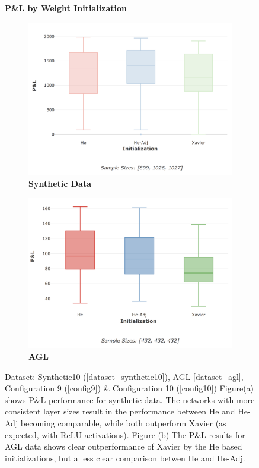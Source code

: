 \documentclass[a4paper,11pt,oneside]{article}
\theoremstyle{plain}
\theoremstyle{definition}
\begin{document}
\begin{figure}[H]
	\centering
	\textbf{P\&L by Weight Initialization}
	\begin{subfigure}{.5\textwidth}
		\centering 
		\includegraphics[scale=0.28]{images/results/newinit/synth_pl_init.png}
		\caption{\textbf{Synthetic Data} 
			\newline }
		\label{figure-synthetic_pl_init}
	\end{subfigure}%
	\begin{subfigure}{.5\textwidth}
		\centering 
		\includegraphics[scale=0.28]{images/results/newinit/agl_pl_init.png}
		\caption{\textbf{AGL} 
			\newline }
		\label{figure-agl_pl_init}
	\end{subfigure}
	\caption[P\&L by Weight Initialization]{Dataset: Synthetic10 (\ref{dataset_synthetic10}), AGL \ref{dataset_agl}, Configuration 9 (\ref{config9}) \& Configuration 10 (\ref{config10})
		\newline Figure(a) shows P\&L performance for synthetic data. The networks with more consistent layer sizes result in the performance between He and He-Adj becoming comparable, while both outperform Xavier (as expected, with ReLU activations). Figure (b) The P\&L results for AGL data shows clear outperformance of Xavier by the He based initializations, but a less clear comparison betwen He and He-Adj.}
	\label{figure-pl_init}
\end{figure}
\end{document}
